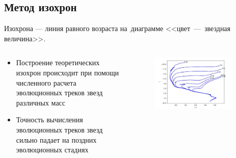 \documentclass{beamer}
\begin{document}
    \subsection{Метод изохрон}
    \begin{frame}
        Изохрона --- линия равного возраста на~диаграмме <<цвет~---~звездная величина>>.
        \begin{columns}
            \begin{column}{0.5\textwidth}
                \begin{itemize}
                    \item Построение теоретических изохрон происходит при помощи численного расчета эволюционных треков звезд различных масс
                    \item Точность вычисления эволюционных треков звезд сильно падает на поздних эволюционных стадиях
                \end{itemize}
            \end{column}
            \begin{column}{0.5\textwidth}
                \begin{figure}
                \centering
                    \includegraphics[width=0.9\textwidth]{pictures/isochrone.jpg}
                \end{figure}
            \end{column}
        \end{columns}
    \end{frame}
\end{document}

